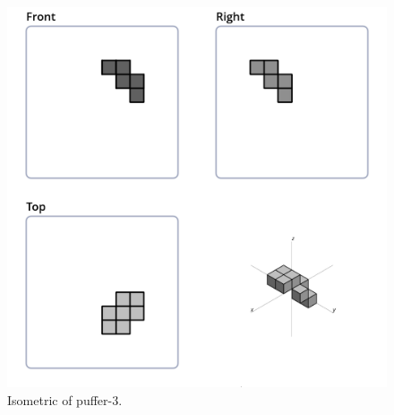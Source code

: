 \begin{figure}
	\centering
	\includegraphics[scale=0.4]{iso_settings/puffer_3.png}
	\caption{Isometric of puffer-3.}
  \label{fig:iso-puffer-3}
\end{figure}
